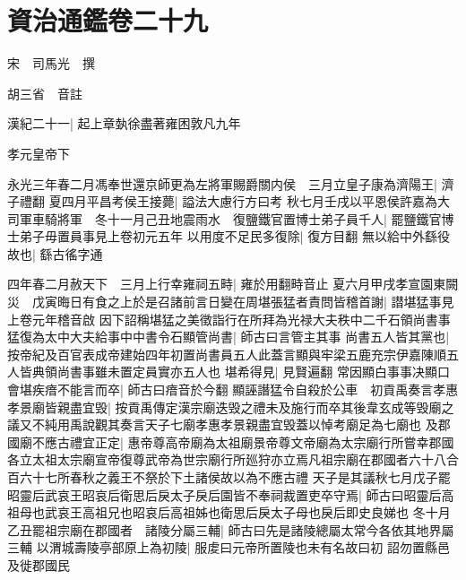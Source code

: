\section{資治通鑑卷二十九}
宋　司馬光　撰

胡三省　音註

漢紀二十一|{
	起上章埶徐盡著雍困敦凡九年}


孝元皇帝下

永光三年春二月馮奉世還京師更為左將軍賜爵關内侯　三月立皇子康為濟陽王|{
	濟子禮翻}
夏四月平昌考侯王接薨|{
	謚法大慮行方曰考}
秋七月壬戌以平恩侯許嘉為大司軍車騎將軍　冬十一月己丑地震雨水　復鹽鐵官置博士弟子員千人|{
	罷鹽鐵官博士弟子毋置員事見上卷初元五年}
以用度不足民多復除|{
	復方目翻}
無以給中外繇役故也|{
	繇古徭字通}


四年春二月赦天下　三月上行幸雍祠五畤|{
	雍於用翻畤音止}
夏六月甲戌孝宣園東闕災　戊寅晦日有食之上於是召諸前言日變在周堪張猛者責問皆稽首謝|{
	譛堪猛事見上卷元年稽音啟}
因下詔稱堪猛之美徵詣行在所拜為光禄大夫秩中二千石領尚書事猛復為太中大夫給事中中書令石顯管尚書|{
	師古曰言管主其事}
尚書五人皆其黨也|{
	按帝紀及百官表成帝建始四年初置尚書員五人此蓋言顯與牢梁五鹿充宗伊嘉陳順五人皆典領尚書事雖未置定員實亦五人也}
堪希得見|{
	見賢遍翻}
常因顯白事事决顯口會堪疾瘖不能言而卒|{
	師古曰瘖音於今翻}
顯誣譖猛令自殺於公車　初貢禹奏言孝惠孝景廟皆親盡宜毁|{
	按貢禹傳定漢宗廟迭毁之禮未及施行而卒其後韋玄成等毁廟之議又不純用禹說觀其奏言天子七廟孝惠孝景親盡宜毁蓋以悼考廟足為七廟也}
及郡國廟不應古禮宜正定|{
	惠帝尊高帝廟為太祖廟景帝尊文帝廟為太宗廟行所嘗幸郡國各立太祖太宗廟宣帝復尊武帝為世宗廟行所廵狩亦立焉凡祖宗廟在郡國者六十八合百六十七所春秋之義王不祭於下土諸侯故以為不應古禮}
天子是其議秋七月戊子罷昭靈后武哀王昭哀后衛思后戾太子戾后園皆不奉祠裁置吏卒守焉|{
	師古曰昭靈后高祖母也武哀王高祖兄也昭哀后高祖姊也衛思后戾太子母也戾后即史良娣也}
冬十月乙丑罷祖宗廟在郡國者　諸陵分屬三輔|{
	師古曰先是諸陵總屬太常今各依其地界屬三輔}
以渭城壽陵亭部原上為初陵|{
	服䖍曰元帝所置陵也未有名故曰初}
詔勿置縣邑及徙郡國民

